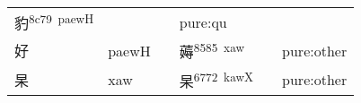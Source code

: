 \documentclass[14pt,a4paper]{scrartcl}
\begin{document}
\begin{longtable}[c]{@{}llllll@{}}
\begin{minipage}[t]{0.14\columnwidth}
豹\textsuperscript{8c79~paewH}
\strut\end{minipage} &
\begin{minipage}[t]{0.14\columnwidth}\raggedright\strut
\strut\end{minipage} &
\begin{minipage}[t]{0.14\columnwidth}\raggedright\strut
\strut\end{minipage} &
\begin{minipage}[t]{0.14\columnwidth}\raggedright\strut
pure:qu
\strut\end{minipage}\tabularnewline
\begin{minipage}[t]{0.14\columnwidth}\raggedright\strut
好
\strut\end{minipage} &
\begin{minipage}[t]{0.14\columnwidth}\raggedright\strut
paewH
\strut\end{minipage} &
\begin{minipage}[t]{0.14\columnwidth}\raggedright\strut
\strut\end{minipage} &
\begin{minipage}[t]{0.14\columnwidth}\raggedright\strut
薅\textsuperscript{8585~xaw}
\strut\end{minipage} &
\begin{minipage}[t]{0.14\columnwidth}\raggedright\strut
\strut\end{minipage} &
\begin{minipage}[t]{0.14\columnwidth}\raggedright\strut
pure:other
\strut\end{minipage}\tabularnewline
\begin{minipage}[t]{0.14\columnwidth}\raggedright\strut
杲
\strut\end{minipage} &
\begin{minipage}[t]{0.14\columnwidth}\raggedright\strut
xaw
\strut\end{minipage} &
\begin{minipage}[t]{0.14\columnwidth}\raggedright\strut
\strut\end{minipage} &
\begin{minipage}[t]{0.14\columnwidth}\raggedright\strut
杲\textsuperscript{6772~kawX}
\strut\end{minipage} &
\begin{minipage}[t]{0.14\columnwidth}\raggedright\strut
\strut\end{minipage} &
\begin{minipage}[t]{0.14\columnwidth}\raggedright\strut
pure:other
\strut\end{minipage}\tabularnewline

\end{longtable}
\end{document}
